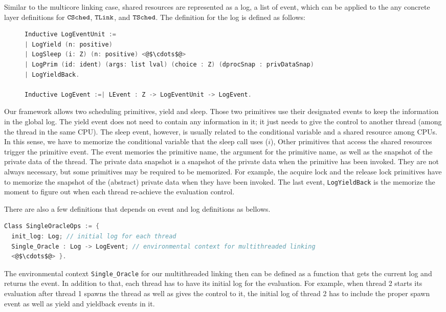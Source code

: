 Similar to the multicore linking case, 
shared resources are represented as a log,  a list of event,
which can be applied to the any concrete layer definitions for ${{\mathrm{\texttt{CSched}}}}$, ${{\mathrm{\texttt{TLink}}}}$, and ${{\mathrm{\texttt{TSched}}}}$.
The definition for the log is defined as follows:
\begin{figure}
\begin{lstlisting}[language=C]
Inductive LogEventUnit :=
| LogYield (n: positive)
| LogSleep (i: Z) (n: positive) <@$\cdots$@>
| LogPrim (id: ident) (args: list lval) (choice : Z) (dprocSnap : privDataSnap) 
| LogYieldBack.

Inductive LogEvent :=| LEvent : Z -> LogEventUnit -> LogEvent.
\end{lstlisting}
\end{figure}
Our framework allows two scheduling primitives, 
yield and sleep. 
Those two primitives use their designated events to keep the information in the global log. 
The yield event does not need to contain any information in it; it just needs to give the control
to another thread (among the thread in the same CPU). 
The sleep event, however, is usually related to the conditional variable and a shared resource among CPUs.
In this sense, we have to memorize the conditional variable that the sleep call uses ($i$),
Other primitives that access the shared resources trigger the primitive event. 
The event memories the primitive name, the argument for the primitive name,
as well as the snapshot of the private data of the thread.
The private data snapshot is a snapshot of the private data when the primitive has been invoked. 
They are not always necessary, but some primitives may be required to be memorized.
For example, the acquire lock and the release lock primitives have to memorize the snapshot of the (abstract) private data when they have been invoked. 
The last event, \lstinline$LogYieldBack$ is the memorize the moment to figure out when each thread re-achieve the evaluation control. 

There are also a few definitions that depends on event and log definitions as bellows.
\begin{lstlisting}[language=C, morekeywords={Class}]
Class SingleOracleOps := {
  init_log: Log; // initial log for each thread
  Single_Oracle : Log -> LogEvent; // environmental context for multithreaded linking
  <@$\cdots$@> }.
\end{lstlisting}
The environmental context \lstinline$Single_Oracle$  for our multithreaded linking
then can be defined as a function that gets the current log and returns the event. 
In addition to that, 
each thread has to have its initial log for the evaluation. 
For example,
when thread 2 starts its evaluation after thread 1 spawns the thread as well as gives the control to it, 
the initial log of thread 2 has to include the proper spawn event as well as yield and yieldback events in it. 

